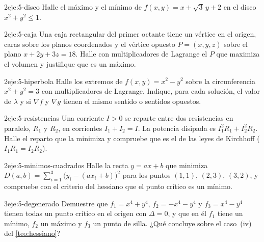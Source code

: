 \begin{ejercicio}{2}{eje:5-disco}
Halle el máximo y el mínimo de $f(x,y)=x+\sqrt3\,y+2$ en el disco $x^2+y^2\le1$.
\end{ejercicio}

\begin{ejercicio}{2}{eje:5-caja}
Una caja rectangular del primer octante tiene un vértice en el origen, caras sobre los planos coordenados y el vértice opuesto $P=(x,y,z)$ sobre el plano $x+2y+3z=18$. Halle con multiplicadores de Lagrange el $P$ que maximiza el volumen y justifique que es un máximo.
\end{ejercicio}

\begin{ejercicio}{2}{eje:5-hiperbola}
Halle los extremos de $f(x,y)=x^2-y^2$ sobre la circunferencia $x^2+y^2=3$ con multiplicadores de Lagrange. Indique, para cada solución, el valor de $\lambda$ y si $\nabla f$ y $\nabla g$ tienen el mismo sentido o sentidos opuestos.
\end{ejercicio}

\begin{ejercicio}{2}{eje:5-resistencias}
Una corriente $I>0$ se reparte entre dos resistencias en paralelo, $R_1$ y $R_2$, en corrientes $I_1+I_2=I$. La potencia disipada es $I_1^2R_1+I_2^2R_2$. Halle el reparto que la minimiza y compruebe que es el de las leyes de Kirchhoff ($I_1R_1=I_2R_2$).
\end{ejercicio}

\begin{ejercicio}{2}{eje:5-minimos-cuadrados}
Halle la recta $y=ax+b$ que minimiza $D(a,b)=\sum_{i=1}^{3}\bigl(y_i-(ax_i+b)\bigr)^2$ para los puntos $(1,1)$, $(2,3)$, $(3,2)$, y compruebe con el criterio del hessiano que el punto crítico es un mínimo.
\end{ejercicio}

\begin{ejercicio}{3}{eje:5-degenerado}
Demuestre que $f_1=x^4+y^4$, $f_2=-x^4-y^4$ y $f_3=x^4-y^4$ tienen todas un punto crítico en el origen con $\Delta=0$, y que en él $f_1$ tiene un mínimo, $f_2$ un máximo y $f_3$ un punto de silla. ¿Qué concluye sobre el caso~(iv) del \cref{teo:hessiano}?
\end{ejercicio}

